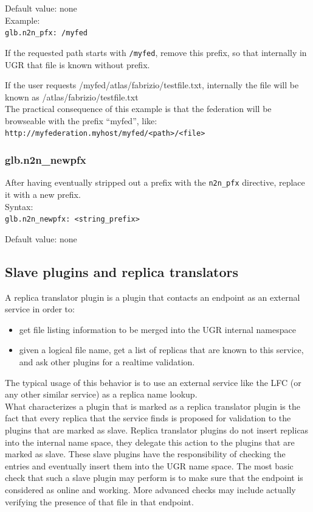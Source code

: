 \documentclass[12pt]{article} %
\begin{document}
Default value: none
\\
Example:\\

\lstinline"glb.n2n_pfx: /myfed"

If the requested path starts with \lstinline"/myfed", remove this prefix, so that internally in UGR that file is known without prefix.

If the user requests /myfed/atlas/fabrizio/testfile.txt, internally the file will be known as /atlas/fabrizio/testfile.txt\\
The practical consequence of this example is that the federation will be browseable with the prefix ``myfed'', like:\\
\lstinline"http://myfederation.myhost/myfed/<path>/<file>"
 
\subsubsection{glb.n2n\_newpfx}

After having eventually stripped out a prefix with the \lstinline"n2n_pfx" directive, replace it with a new prefix.\\
Syntax:\\
\lstinline"glb.n2n_newpfx: <string_prefix>"

Default value: none


\subsection{Slave plugins and replica translators}

A replica translator plugin is a plugin that contacts an endpoint as an external service in order to:

\begin{itemize}
 \item get file listing information to be merged into the UGR internal namespace
 \item given a logical file name, get a list of replicas that are known to this service, and ask other plugins for a realtime validation.
\end{itemize}

The typical usage of this behavior is to use an external service like the LFC (or any other similar service) as a replica name lookup.\\

What characterizes a plugin that is marked as a replica translator plugin is the fact that every replica that the service finds is proposed for validation to the plugins that are marked as slave. Replica translator plugins do not insert replicas into the internal name space, they delegate this action to the plugins that are marked as slave. These slave plugins have the responsibility of checking the entries and eventually insert them into the UGR name space. The most basic check that such a slave plugin may perform is to make sure that the endpoint is considered as online and working. More advanced checks may include actually verifying the presence of that file in that endpoint.\\
\end{document}
